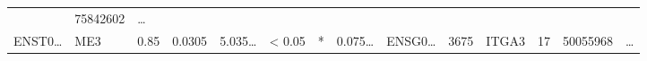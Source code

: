 \documentclass[
]{article}
\begin{document}
\begin{longtable}[]{@{}llllllllllllll@{}}
\begin{minipage}[t]{0.05\columnwidth}
\end{minipage} & \begin{minipage}[t]{0.05\columnwidth}\raggedright
75842602\strut
\end{minipage} & \begin{minipage}[t]{0.02\columnwidth}\raggedright
\ldots{}\strut
\end{minipage}\tabularnewline
\begin{minipage}[t]{0.05\columnwidth}\raggedright
ENST0\ldots{}\strut
\end{minipage} & \begin{minipage}[t]{0.04\columnwidth}\raggedright
ME3\strut
\end{minipage} & \begin{minipage}[t]{0.04\columnwidth}\raggedright
0.85\strut
\end{minipage} & \begin{minipage}[t]{0.04\columnwidth}\raggedright
0.0305\strut
\end{minipage} & \begin{minipage}[t]{0.05\columnwidth}\raggedright
5.035\ldots{}\strut
\end{minipage} & \begin{minipage}[t]{0.05\columnwidth}\raggedright
\textless{} 0.05\strut
\end{minipage} & \begin{minipage}[t]{0.03\columnwidth}\raggedright
*\strut
\end{minipage} & \begin{minipage}[t]{0.05\columnwidth}\raggedright
0.075\ldots{}\strut
\end{minipage} & \begin{minipage}[t]{0.05\columnwidth}\raggedright
ENSG0\ldots{}\strut
\end{minipage} & \begin{minipage}[t]{0.05\columnwidth}\raggedright
3675\strut
\end{minipage} & \begin{minipage}[t]{0.05\columnwidth}\raggedright
ITGA3\strut
\end{minipage} & \begin{minipage}[t]{0.05\columnwidth}\raggedright
17\strut
\end{minipage} & \begin{minipage}[t]{0.05\columnwidth}\raggedright
50055968\strut
\end{minipage} & \begin{minipage}[t]{0.02\columnwidth}\raggedright
\ldots{}\strut

\end{minipage}
\end{longtable}
\end{document}
